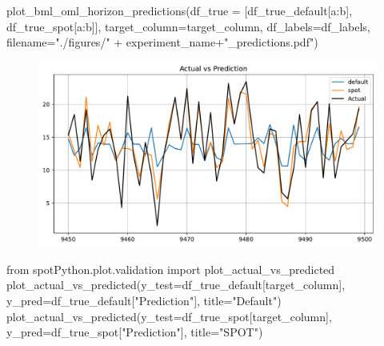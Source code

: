 \documentclass[
  letterpaper,
  DIV=11,
  numbers=noendperiod]{scrreprt}
\newenvironment{Shaded}{\begin{snugshade}}{\end{snugshade}}
\newcommand{\ImportTok}[1]{\textcolor[rgb]{0.00,0.46,0.62}{#1}}
\newcommand{\NormalTok}[1]{\textcolor[rgb]{0.00,0.23,0.31}{#1}}
\newcommand{\OperatorTok}[1]{\textcolor[rgb]{0.37,0.37,0.37}{#1}}
\newcommand{\StringTok}[1]{\textcolor[rgb]{0.13,0.47,0.30}{#1}}
\begin{document}
\begin{Shaded}
\begin{Highlighting}[]
\NormalTok{plot\_bml\_oml\_horizon\_predictions(df\_true }\OperatorTok{=}\NormalTok{ [df\_true\_default[a:b], df\_true\_spot[a:b]], target\_column}\OperatorTok{=}\NormalTok{target\_column,  df\_labels}\OperatorTok{=}\NormalTok{df\_labels, filename}\OperatorTok{=}\StringTok{"./figures/"} \OperatorTok{+}\NormalTok{ experiment\_name}\OperatorTok{+}\StringTok{"\_predictions.pdf"}\NormalTok{)}
\end{Highlighting}
\end{Shaded}

\begin{figure}[H]

{\centering \includegraphics{024_spot_hpt_river_friedman_hatr_files/figure-pdf/cell-35-output-1.pdf}

}

\end{figure}

\begin{Shaded}
\begin{Highlighting}[]
\ImportTok{from}\NormalTok{ spotPython.plot.validation }\ImportTok{import}\NormalTok{ plot\_actual\_vs\_predicted}
\NormalTok{plot\_actual\_vs\_predicted(y\_test}\OperatorTok{=}\NormalTok{df\_true\_default[target\_column], y\_pred}\OperatorTok{=}\NormalTok{df\_true\_default[}\StringTok{"Prediction"}\NormalTok{], title}\OperatorTok{=}\StringTok{"Default"}\NormalTok{)}
\NormalTok{plot\_actual\_vs\_predicted(y\_test}\OperatorTok{=}\NormalTok{df\_true\_spot[target\_column], y\_pred}\OperatorTok{=}\NormalTok{df\_true\_spot[}\StringTok{"Prediction"}\NormalTok{], title}\OperatorTok{=}\StringTok{"SPOT"}\NormalTok{)}
\end{Highlighting}
\end{Shaded}
\end{document}
